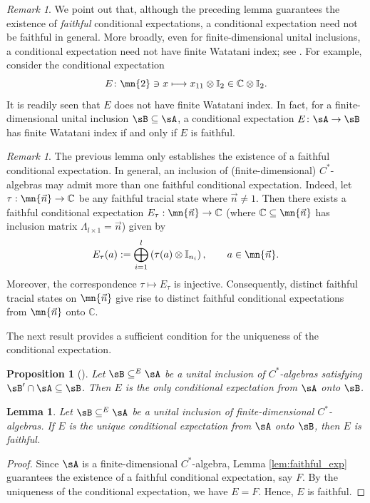 \documentclass[12pt,a4paper]{amsart}
\theoremstyle{plain}
\newtheorem{prop}[theorem]{Proposition}
\newtheorem{lem}[theorem]{Lemma}
\theoremstyle{definition}
\theoremstyle{remark}
\newtheorem{remark}[theorem]{Remark}
\numberwithin{equation}{section}
\theoremstyle{ser}
\theoremstyle{serr}
\theoremstyle{ser}
\theoremstyle{ser}
\theoremstyle{collabquestion}
\newcommand{\C}{\mathbb{C}}
\newcommand{\<}{\langle}
\renewcommand{\>}{\rangle}
\begin{document}
\begin{remark}
    We point out that, although the preceding lemma guarantees the existence of \emph{faithful} conditional expectations, a conditional expectation need not be faithful in general. More broadly, even for finite-dimensional unital inclusions, a conditional expectation need not have finite Watatani index; see \cite{watatani1990}. For example, consider the conditional expectation
    \[
        E \colon \mn{2} \ni x \longmapsto x_{11}\otimes \mathbb{I}_2 \in \mathbb{C}\otimes \mathbb{I}_2.
    \]
    It is readily seen that $E$ does not have finite Watatani index. In fact, for a finite-dimensional unital inclusion $\sB \subseteq \sA$, a conditional expectation $E\colon \sA\to\sB$ has finite Watatani index if and only if $E$ is faithful.
\end{remark}

\begin{remark}
    The previous lemma only establishes the existence of a faithful conditional expectation. In general, an inclusion of (finite-dimensional) $C^*$-algebras may admit more than one faithful conditional expectation. Indeed, let $\tau:\mn{\vec{n}}\to \C$ be any faithful tracial state where $\vec{n} \ne 1$. Then there exists a faithful conditional expectation $E_\tau:\mn{\vec{n}} \to \C$ (where $\C \subseteq \mn{\vec{n}}$ has inclusion matrix $\Lambda_{l \times 1} = \vec{n}$) given by
    \[
    E_\tau(a):= \bigoplus_{i = 1}^l \left( \tau(a) \otimes \mathbb{I}_{n_i} \right), \qquad a \in \mn{\vec{n}}.
    \]
    Moreover, the correspondence $\tau \mapsto E_\tau$ is injective. Consequently, distinct faithful tracial states on $\mn{\vec{n}}$ give rise to distinct faithful conditional expectations from $\mn{\vec{n}}$ onto $\C$.
\end{remark}


The next result provides a sufficient condition for the uniqueness of the conditional expectation.

\begin{prop}[{\cite[Corollary 1.4.3]{watatani1990}}]\label{prop:wata_exp}
    Let $\sB \subseteq^E \sA$ be a unital inclusion of $C^*$-algebras satisfying $\sB'\cap \sA \subseteq \sB$. Then $E$ is the only conditional expectation from $\sA$ onto $\sB$.
\end{prop}

\begin{lem}\label{lem:uniq_imply_faithful}
   Let $\sB \subseteq^E \sA$ be a unital inclusion of finite-dimensional $C^*$-algebras. If $E$ is the unique conditional expectation from $\sA$ onto $\sB$, then $E$ is faithful.
\end{lem}
\begin{proof}
 Since $\sA$ is a finite-dimensional $C^*$-algebra, Lemma \ref{lem:faithful_exp} guarantees the existence of a faithful conditional expectation, say $F$. By the uniqueness of the conditional expectation, we have $E=F$. Hence, $E$ is faithful.
\end{proof}
\end{document}
